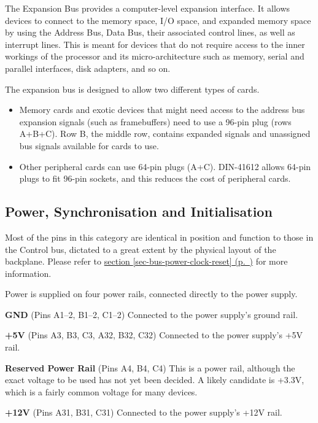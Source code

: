 \documentclass[11pt,a4paper,twocolumns]{article}
\newcommand{\cf}[2][section]{\hyperref[#2]{#1 \ref*{#2} (p.~\pageref*{#2})}}
\begin{document}
The Expansion Bus provides a computer-level expansion interface. It
allows devices to connect to the memory space, I/O space, and expanded
memory space by using the Address Bus, Data Bus, their associated
control lines, as well as interrupt lines. This is meant for devices
that do not require access to the inner workings of the processor and
its micro-architecture such as memory, serial and parallel interfaces,
disk adapters, and so on.

The expansion bus is designed to allow two different types of cards.

\begin{itemize}
\item Memory cards and exotic devices that might need access to the
  address bus expansion signals (such as framebuffers) need to use a
  96-pin plug (rows A+B+C). Row B, the middle row, contains expanded
  signals and unassigned bus signals available for cards to use.
\item Other peripheral cards can use 64-pin plugs (A+C). DIN-41612
  allows 64-pin plugs to fit 96-pin sockets, and this reduces the cost
  of peripheral cards.
\end{itemize}


\subsection{Power, Synchronisation and Initialisation}

Most of the pins in this category are identical in position and
function to those in the Control bus, dictated to a great extent by
the physical layout of the backplane. Please refer to
\cf{sec-bus-power-clock-reset} for more information.

Power is supplied on four power rails, connected directly to the power
supply.

\begin{description}
\item{\bf GND} (Pins A1–2, B1–2, C1–2) Connected
  to the power supply's ground rail.
\item{\bf +5V} (Pins A3, B3, C3, A32, B32, C32) Connected to the power supply's +5V rail.
\item{\bf Reserved Power Rail} (Pins A4, B4, C4) This is a power rail,
  although the exact voltage to be used has not yet been decided. A
  likely candidate is +3.3V, which is a fairly common voltage for many
  devices.
\item{\bf +12V} (Pins A31, B31, C31) Connected to the power supply's
  +12V rail.
\end{description}
\end{document}
